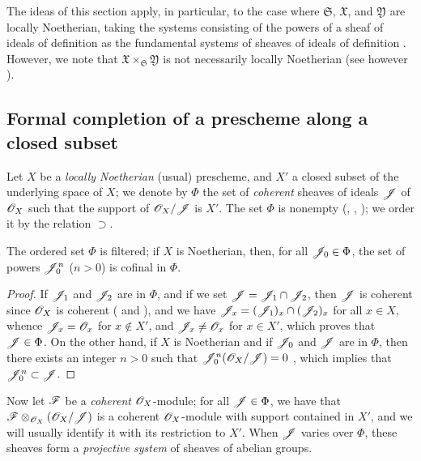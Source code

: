\begin{env}[10.7.4]
The ideas of this section apply, in particular, to the case where $\mathfrak{S}$, $\mathfrak{X}$, and $\mathfrak{Y}$ are locally Noetherian, taking the systems consisting of the powers of a sheaf of ideals of definition  as the fundamental systems of sheaves of ideals of definition .
However, we note that $\mathfrak{X}\times_\mathfrak{S}\mathfrak{Y}$ is not necessarily locally Noetherian (see however ).
\end{env}

\subsection{Formal completion of a prescheme along a closed subset}
\label{subsection:1.10.8}

\begin{env}[10.8.1]
\label{1.10.8.1}
Let $X$ be a \emph{locally Noetherian} (usual) prescheme, and $X'$ a closed subset of the underlying space of $X$; we denote by $\Phi$ the set of \emph{coherent} sheaves of ideals $\mathscr{J}$ of $\mathscr{O}_X$ such that the support of $\mathscr{O}_X/\mathscr{J}$ is $X'$.
The set $\Phi$ is nonempty (, , ); we order it by the relation $\supset$.
\end{env}

\begin{lem}[10.8.2]
\label{1.10.8.2}
The ordered set $\Phi$ is filtered; if $X$ is Noetherian, then, for all $\mathscr{J}_0\in\Phi$, the set of powers $\mathscr{J}_0^n$ ($n>0$) is cofinal in $\Phi$.
\end{lem}

\begin{proof}
\label{proof-1.10.8.2}
If $\mathscr{J}_1$ and $\mathscr{J}_2$ are in $\Phi$, and if we set $\mathscr{J}=\mathscr{J}_1\cap\mathscr{J}_2$, then $\mathscr{J}$ is coherent since $\mathscr{O}_X$ is coherent ( and ), and we have $\mathscr{J}_x=(\mathscr{J}_1)_x\cap(\mathscr{J}_2)_x$ for all $x\in X$, whence $\mathscr{J}_x=\mathscr{O}_x$ for $x\not\in X'$, and $\mathscr{J}_x\neq\mathscr{O}_x$ for $x\in X'$, which proves that $\mathscr{J}\in\Phi$.
On the other hand, if $X$ is Noetherian and if $\mathscr{J}_0$ and $\mathscr{J}$ are in $\Phi$, then there exists an integer $n>0$ such that $\mathscr{J}_0^n(\mathscr{O}_X/\mathscr{J})=0$ , which implies that $\mathscr{J}_0^n\subset\mathscr{J}$.
\end{proof}

\begin{env}[10.8.3]
\label{1.10.8.2}
Now let $\mathscr{F}$ be a \emph{coherent} $\mathscr{O}_X$-module; for all $\mathscr{J}\in\Phi$, we have that $\mathscr{F}\otimes_{\mathscr{O}_X}(\mathscr{O}_X/\mathscr{J})$ is a coherent $\mathscr{O}_X$-module  with support contained in $X'$, and we will usually identify it with its restriction to $X'$.
When $\mathscr{J}$ varies over $\Phi$, these sheaves form a \emph{projective system} of sheaves of abelian groups.
\end{env}

